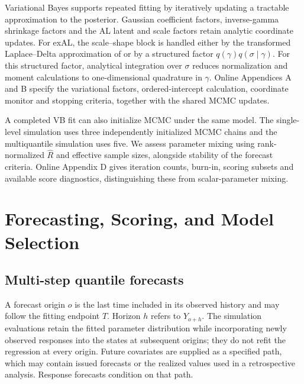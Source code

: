 \documentclass[12pt,letterpaper]{article}
\numberwithin{equation}{section}
\begin{document}
Variational Bayes supports repeated fitting by iteratively updating a
tractable approximation to the posterior. Gaussian coefficient factors,
inverse-gamma shrinkage factors and the AL latent and scale factors retain
analytic coordinate updates. For exAL, the scale--shape block is handled
either by the transformed Laplace--Delta approximation of
\citet{wang2013nonconjugatevb} or by a structured factor
\(q(\gamma)q(\sigma\mid\gamma)\). For this structured factor, analytical
integration over \(\sigma\) reduces normalization and moment calculations
to one-dimensional quadrature in \(\gamma\). Online Appendices A and B
specify the variational factors, ordered-intercept calculation, coordinate
monitor and stopping criteria, together with the shared MCMC updates.

A completed VB fit can also initialize MCMC under the same model. The single-level simulation
uses three independently initialized MCMC chains and the multiquantile
simulation uses five. We assess parameter mixing using rank-normalized
\(\widehat R\) and effective sample sizes, alongside stability of the
forecast criteria. Online Appendix D gives iteration counts, burn-in,
scoring subsets and available score diagnostics, distinguishing these from
scalar-parameter mixing.

\section{Forecasting, Scoring, and Model Selection}
\label{sec:forecast}

\subsection{Multi-step quantile forecasts}

A forecast origin \(o\) is the last time included in its observed history
and may follow the fitting endpoint \(T\). Horizon \(h\) refers to
\(Y_{o+h}\). The simulation evaluations retain the fitted parameter
distribution while incorporating newly observed responses into the states
at subsequent origins; they do not refit the regression at every origin.
Future covariates are supplied as a specified path, which may contain issued
forecasts or the realized values used in a retrospective analysis. Response
forecasts condition on that path.
\end{document}
